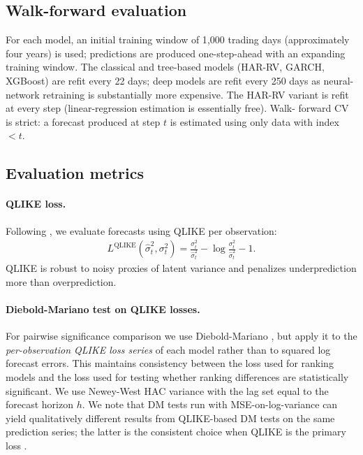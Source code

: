 \documentclass[11pt]{article}
\begin{document}
\subsection{Walk-forward evaluation}

For each model, an initial training window of 1{,}000 trading days
(approximately four years) is used; predictions are produced
one-step-ahead with an expanding training window. The classical and
tree-based models (HAR-RV, GARCH, XGBoost) are refit every 22 days;
deep models are refit every 250 days as neural-network retraining is
substantially more expensive. The HAR-RV variant is refit at every
step (linear-regression estimation is essentially free). Walk-
forward CV is strict: a forecast produced at step $t$ is estimated
using only data with index $<\!t$.

\subsection{Evaluation metrics}

\paragraph{QLIKE loss.} Following \citet{patton2011}, we evaluate
forecasts using QLIKE per observation:
\begin{align}
L^{\mathrm{QLIKE}}(\hat\sigma^2_t, \sigma^2_t)
 = \frac{\sigma^2_t}{\hat\sigma^2_t} - \log \frac{\sigma^2_t}{\hat\sigma^2_t} - 1.
\end{align}
QLIKE is robust to noisy proxies of latent variance and penalizes
underprediction more than overprediction.

\paragraph{Diebold-Mariano test on QLIKE losses.} For pairwise
significance comparison we use Diebold-Mariano
\citep{dieboldmariano1995}, but apply it to the
\emph{per-observation QLIKE loss series} of each model rather than
to squared log forecast errors. This maintains consistency between
the loss used for ranking models and the loss used for testing
whether ranking differences are statistically significant. We use
Newey-West HAC variance with the lag set equal to the forecast
horizon $h$. We note that DM tests run with MSE-on-log-variance can
yield qualitatively different results from QLIKE-based DM tests on
the same prediction series; the latter is the consistent choice
when QLIKE is the primary loss \citep{patton2009volatility}.
\end{document}
